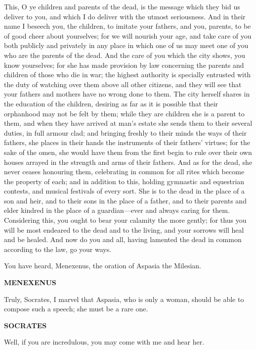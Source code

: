 \documentclass[11pt,letter]{article}
\begin{document}
\par  This, O ye children and parents of the dead, is the message which they bid us deliver to you, and which I do deliver with the utmost seriousness. And in their name I beseech you, the children, to imitate your fathers, and you, parents, to be of good cheer about yourselves; for we will nourish your age, and take care of you both publicly and privately in any place in which one of us may meet one of you who are the parents of the dead. And the care of you which the city shows, you know yourselves; for she has made provision by law concerning the parents and children of those who die in war; the highest authority is specially entrusted with the duty of watching over them above all other citizens, and they will see that your fathers and mothers have no wrong done to them. The city herself shares in the education of the children, desiring as far as it is possible that their orphanhood may not be felt by them; while they are children she is a parent to them, and when they have arrived at man's estate she sends them to their several duties, in full armour clad; and bringing freshly to their minds the ways of their fathers, she places in their hands the instruments of their fathers' virtues; for the sake of the omen, she would have them from the first begin to rule over their own houses arrayed in the strength and arms of their fathers. And as for the dead, she never ceases honouring them, celebrating in common for all rites which become the property of each; and in addition to this, holding gymnastic and equestrian contests, and musical festivals of every sort. She is to the dead in the place of a son and heir, and to their sons in the place of a father, and to their parents and elder kindred in the place of a guardian—ever and always caring for them. Considering this, you ought to bear your calamity the more gently; for thus you will be most endeared to the dead and to the living, and your sorrows will heal and be healed. And now do you and all, having lamented the dead in common according to the law, go your ways.

\par  You have heard, Menexenus, the oration of Aspasia the Milesian.

\par \textbf{MENEXENUS}
\par   Truly, Socrates, I marvel that Aspasia, who is only a woman, should be able to compose such a speech; she must be a rare one.

\par \textbf{SOCRATES}
\par   Well, if you are incredulous, you may come with me and hear her.
\end{document}
